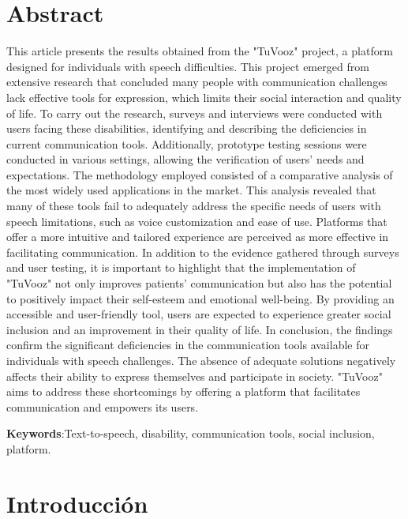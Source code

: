 \documentclass[12pt, a4paper, twocolumn]{article}
\begin{document}
\section{Abstract}
This article presents the results obtained from the "TuVooz" project, a platform designed for individuals with speech difficulties. This project emerged from extensive research that concluded many people with communication challenges lack effective tools for expression, which limits their social interaction and quality of life. To carry out the research, surveys and interviews were conducted with users facing these disabilities, identifying and describing the deficiencies in current communication tools. Additionally, prototype testing sessions were conducted in various settings, allowing the verification of users' needs and expectations.
The methodology employed consisted of a comparative analysis of the most widely used applications in the market. This analysis revealed that many of these tools fail to adequately address the specific needs of users with speech limitations, such as voice customization and ease of use. Platforms that offer a more intuitive and tailored experience are perceived as more effective in facilitating communication.
In addition to the evidence gathered through surveys and user testing, it is important to highlight that the implementation of "TuVooz" not only improves patients' communication but also has the potential to positively impact their self-esteem and emotional well-being. By providing an accessible and user-friendly tool, users are expected to experience greater social inclusion and an improvement in their quality of life.
In conclusion, the findings confirm the significant deficiencies in the communication tools available for individuals with speech challenges. The absence of adequate solutions negatively affects their ability to express themselves and participate in society. "TuVooz" aims to address these shortcomings by offering a platform that facilitates communication and empowers its users.

\textbf{Keywords}:Text-to-speech, disability, communication tools, social inclusion, platform.



\section{Introducción}
\end{document}
